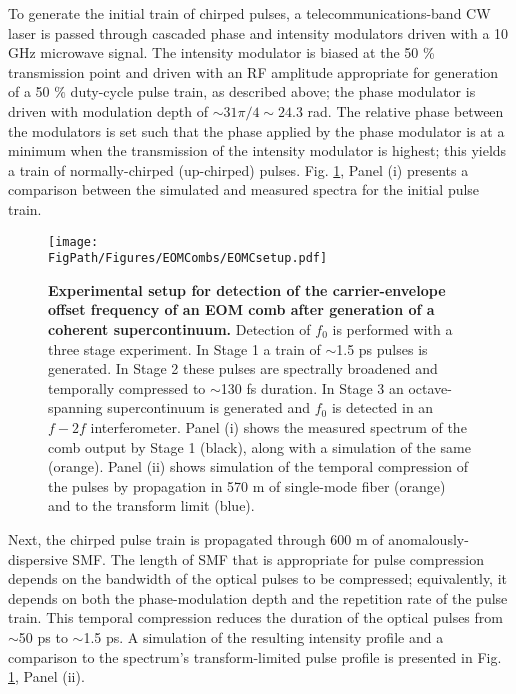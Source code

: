To generate the initial train of chirped pulses, a telecommunications-band CW laser is passed through cascaded phase and intensity modulators driven with a 10 GHz microwave signal. The intensity modulator is biased at the 50 \% transmission point and driven with an RF amplitude appropriate for generation of a 50 $\%$ duty-cycle pulse train, as described above;  the phase modulator is driven with modulation depth of $\sim31\pi/4\sim24.3$ rad. The relative phase between the modulators is set such that the phase applied by the phase modulator is at a minimum when the transmission of the intensity modulator is highest; this yields a train of normally-chirped (up-chirped) pulses. Fig. \ref{fig:EOMC_Schematic}, Panel (i) presents a comparison between the simulated and measured spectra for the initial pulse train. 


\begin{figure}[htpb]
	\begin{center}
		\texttt{[image: \\FigPath/Figures/EOMCombs/EOMCsetup.pdf]}
	\end{center}
	\caption[Experimental setup for detection of the carrier-envelope offset frequency of an EOM comb after generation of a coherent supercontinuum]{\textbf{Experimental setup for detection of the carrier-envelope offset frequency of an EOM comb after generation of a coherent supercontinuum.} Detection of $f_0$ is performed with a three stage experiment. In Stage 1 a train of $\sim$1.5 ps pulses is generated. In Stage 2 these pulses are spectrally broadened and temporally compressed to $\sim$130 fs duration. In Stage 3 an octave-spanning supercontinuum is generated and $f_0$ is detected in an $f-2f$ interferometer. Panel (i) shows the measured spectrum of the comb output by Stage 1 (black), along with a simulation of the same (orange). Panel (ii) shows simulation of the temporal compression of the pulses by propagation in 570 m of single-mode fiber (orange) and to the transform limit (blue).}
	\label{fig:EOMC_Schematic}
\end{figure} 


Next, the chirped pulse train is propagated through 600 m of anomalously-dispersive SMF. The length of SMF that is appropriate for pulse compression depends on the bandwidth of the optical pulses to be compressed; equivalently, it depends on both the phase-modulation depth and the repetition rate of the pulse train. This temporal compression reduces the duration of the optical pulses from $\sim$50 ps to $\sim$1.5 ps. A simulation of the resulting intensity profile and a comparison to the spectrum's transform-limited pulse profile is presented in Fig. \ref{fig:EOMC_Schematic}, Panel (ii). 

